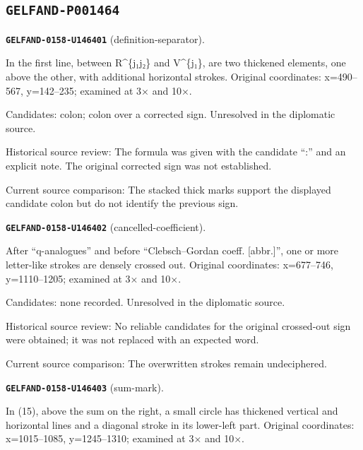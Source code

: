 \subsection*{\texttt{GELFAND-P001464}}
\par\noindent\leavevmode{}\label{GELFAND-0158-U146401}\label{GELFAND-P001464:definition-separator}\textbf{\texttt{GELFAND-0158-U146401}} (definition-separator).\nopagebreak[4]\par
In the first line, between R\textasciicircum{}\{j₁j₂\} and V\textasciicircum{}\{j₁\}, are two thickened elements, one above the other, with additional horizontal strokes. Original coordinates: x=490–567, y=142–235; examined at 3× and 10×.\par
Candidates: colon; colon over a corrected sign. Unresolved in the diplomatic source.\par
Historical source review: The formula was given with the candidate “:” and an explicit note. The original corrected sign was not established.\par
Current source comparison: The stacked thick marks support the displayed candidate colon but do not identify the previous sign.\par\medskip
\par\noindent\leavevmode{}\label{GELFAND-0158-U146402}\label{GELFAND-P001464:cancelled-coefficient}\textbf{\texttt{GELFAND-0158-U146402}} (cancelled-coefficient).\nopagebreak[4]\par
After “q-analogues” and before “Clebsch–Gordan coeff. [abbr.]”, one or more letter-like strokes are densely crossed out. Original coordinates: x=677–746, y=1110–1205; examined at 3× and 10×.\par
Candidates: none recorded. Unresolved in the diplomatic source.\par
Historical source review: No reliable candidates for the original crossed-out sign were obtained; it was not replaced with an expected word.\par
Current source comparison: The overwritten strokes remain undeciphered.\par\medskip
\par\noindent\leavevmode{}\label{GELFAND-0158-U146403}\label{GELFAND-P001464:sum-mark}\textbf{\texttt{GELFAND-0158-U146403}} (sum-mark).\nopagebreak[4]\par
In (15), above the sum on the right, a small circle has thickened vertical and horizontal lines and a diagonal stroke in its lower-left part. Original coordinates: x=1015–1085, y=1245–1310; examined at 3× and 10×.\par

